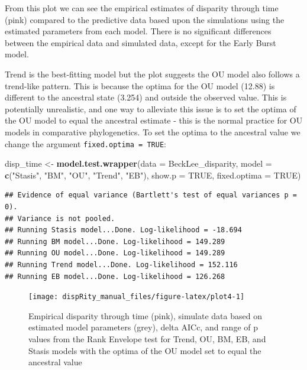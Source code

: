 \documentclass[]{book}
\newenvironment{Shaded}{\begin{snugshade}}{\end{snugshade}}
\newcommand{\DataTypeTok}[1]{\textcolor[rgb]{0.13,0.29,0.53}{#1}}
\newcommand{\KeywordTok}[1]{\textcolor[rgb]{0.13,0.29,0.53}{\textbf{#1}}}
\newcommand{\NormalTok}[1]{#1}
\newcommand{\OtherTok}[1]{\textcolor[rgb]{0.56,0.35,0.01}{#1}}
\newcommand{\StringTok}[1]{\textcolor[rgb]{0.31,0.60,0.02}{#1}}
\begin{document}
From this plot we can see the empirical estimates of disparity through time (pink) compared to the predictive data based upon the simulations using the estimated parameters from each model.
There is no significant differences between the empirical data and simulated data, except for the Early Burst model.

Trend is the best-fitting model but the plot suggests the OU model also follows a trend-like pattern.
This is because the optima for the OU model (12.88) is different to the ancestral state (3.254) and outside the observed value.
This is potentially unrealistic, and one way to alleviate this issue is to set the optima of the OU model to equal the ancestral estimate - this is the normal practice for OU models in comparative phylogenetics.
To set the optima to the ancestral value we change the argument \texttt{fixed.optima\ =\ TRUE}:

\begin{Shaded}
\begin{Highlighting}[]
\NormalTok{disp_time <-}\StringTok{ }\KeywordTok{model.test.wrapper}\NormalTok{(}\DataTypeTok{data =}\NormalTok{ BeckLee_disparity,}
                    \DataTypeTok{model =} \KeywordTok{c}\NormalTok{(}\StringTok{"Stasis"}\NormalTok{, }\StringTok{"BM"}\NormalTok{, }\StringTok{"OU"}\NormalTok{, }\StringTok{"Trend"}\NormalTok{, }\StringTok{"EB"}\NormalTok{),}
                                \DataTypeTok{show.p =} \OtherTok{TRUE}\NormalTok{, }\DataTypeTok{fixed.optima =} \OtherTok{TRUE}\NormalTok{)}
\end{Highlighting}
\end{Shaded}

\begin{verbatim}
## Evidence of equal variance (Bartlett's test of equal variances p = 0).
## Variance is not pooled.
## Running Stasis model...Done. Log-likelihood = -18.694
## Running BM model...Done. Log-likelihood = 149.289
## Running OU model...Done. Log-likelihood = 149.289
## Running Trend model...Done. Log-likelihood = 152.116
## Running EB model...Done. Log-likelihood = 126.268
\end{verbatim}

\begin{figure}

{\centering \texttt{[image: dispRity\_manual\_files/figure-latex/plot4-1]} 

}

\caption{Empirical disparity through time (pink), simulate data based on estimated model parameters (grey), delta AICc, and range of p values from the Rank Envelope test for Trend, OU, BM, EB, and Stasis models with the optima of the OU model set to equal the ancestral value}\label{fig:plot4}
\end{figure}
\end{document}
